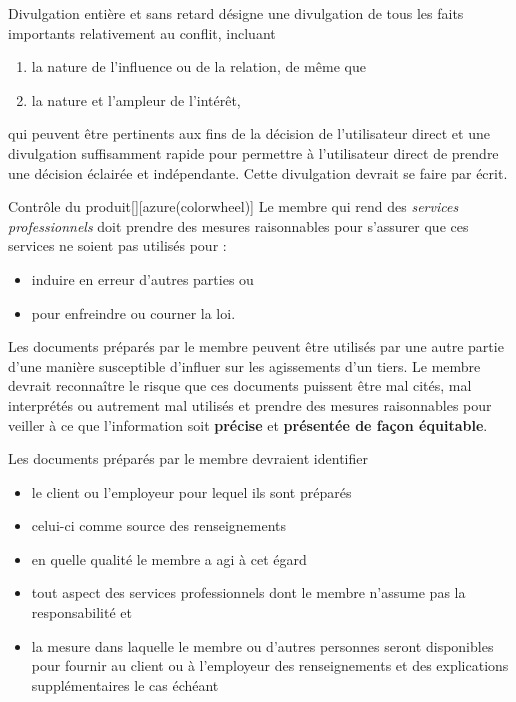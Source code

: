 \documentclass[10pt, french]{article}
\begin{document}
\begin{multicols*}{2}
\begin{definitionNOHFILLsub}[Annotation 5-1]
\og Divulgation entière et sans retard \fg{} désigne une divulgation de tous les faits importants relativement au conflit, incluant 
\begin{enumerate}
	\item	la nature de l’influence ou de la relation, de même que 
	\item	la nature et l’ampleur de l’intérêt,
\end{enumerate}
qui peuvent être pertinents aux fins de la décision de l’utilisateur direct et une divulgation suffisamment rapide pour permettre à l’utilisateur direct de prendre une décision éclairée et indépendante. Cette divulgation devrait se faire par écrit.  
\end{definitionNOHFILLsub}

\bigskip

\begin{definitionGENERAL}{Contrôle du produit}[][azure(colorwheel)]
Le membre qui rend des \og \textit{services professionnels} \fg{} doit prendre des mesures raisonnables pour s'assurer que ces services ne soient pas utilisés pour :
\begin{itemize}
	\item	induire en erreur d'autres parties ou 
	\item	pour enfreindre ou courner la loi.
\end{itemize}
\end{definitionGENERAL}

\begin{definitionNOHFILLsub}[Annotation 6-1]
Les documents préparés par le membre peuvent être utilisés par une autre partie d’une manière susceptible d’influer sur les agissements d’un tiers. Le membre devrait reconnaître le risque que ces documents puissent être mal cités, mal interprétés ou autrement mal utilisés et prendre des mesures raisonnables pour veiller à ce que l’information soit \textbf{précise} et \textbf{présentée de façon équitable}. 
\end{definitionNOHFILLsub}

\begin{definitionNOHFILLsub}[Annotation 6-2]
Les documents préparés par le membre devraient identifier 
\begin{itemize}
	\item	le client ou l’employeur pour lequel ils sont préparés
	\item	celui-ci comme source des renseignements
	\item	en quelle qualité le membre a agi à cet égard
	\item	tout aspect des services professionnels dont le membre n’assume pas la responsabilité et
	\item	la mesure dans laquelle le membre ou d’autres personnes seront disponibles pour fournir au client ou à l’employeur des renseignements et des explications supplémentaires le cas échéant
\end{itemize}
\end{definitionNOHFILLsub}


\end{multicols*}
\end{document}
